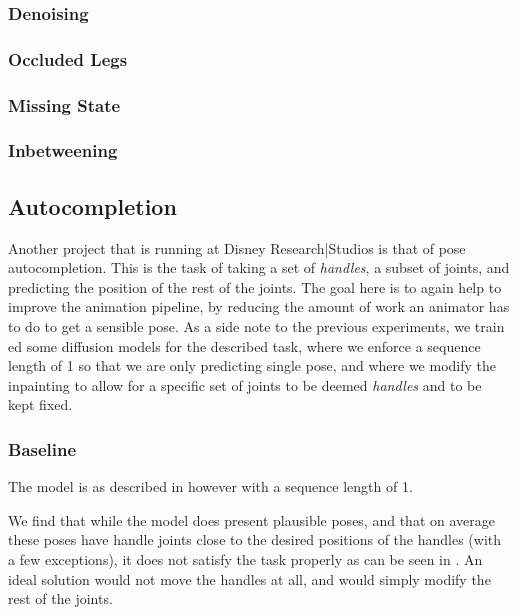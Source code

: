 \subsubsection{Denoising}
\subsubsection{Occluded Legs}
\subsubsection{Missing State}
\subsubsection{Inbetweening}


\subsection{Autocompletion}
\label{sec:autocomplete}

Another project that is running at Disney Research|Studios is that of pose autocompletion. This is the task of taking a set of \textit{handles}, a subset of joints, and predicting the position of the rest of the joints. The goal here is to again help to improve the animation pipeline, by reducing the amount of work an animator has to do to get a sensible pose. As a side note to the previous experiments, we train
ed some diffusion models for the described task, where we enforce a sequence length of 1 so that we are only predicting  single pose, and where we modify the inpainting to allow for a specific set of joints to be deemed \textit{handles} and to be kept fixed.

\subsubsection{Baseline}
The model is as described in  however with a sequence length of 1.

We find that while the model does present plausible poses, and that on average these poses have handle joints close to the desired positions of the handles (with a few exceptions), it does not satisfy the task properly as can be seen in . An ideal solution would not move the handles at all, and would simply modify the rest of the joints.

